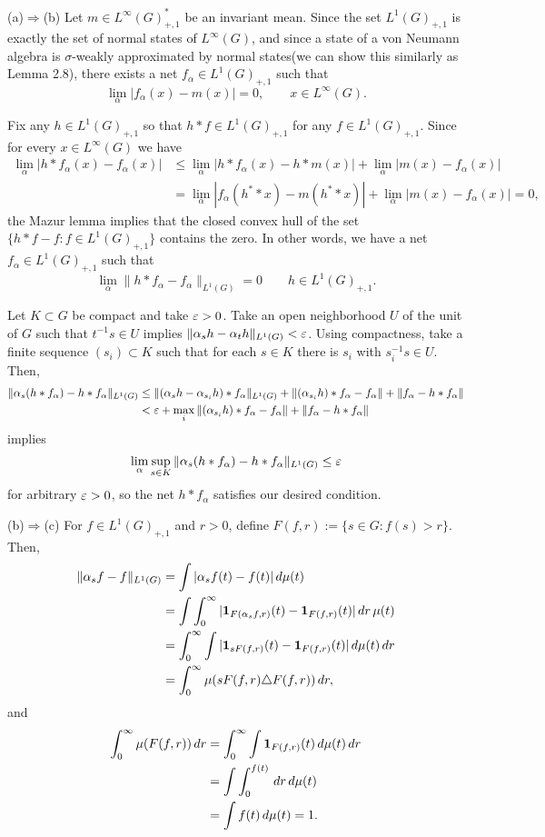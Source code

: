 \documentclass{../../../small}
\begin{document}
\begin{pf}
(a)$\Rightarrow$(b)
Let $m\in L^\infty(G)^*_{+,1}$ be an invariant mean.
Since the set $L^1(G)_{+,1}$ is exactly the set of normal states of $L^\infty(G)$, and since a state of a von Neumann algebra is $\sigma$-weakly approximated by normal states(we can show this similarly as Lemma 2.8), there exists a net $f_\alpha\in L^1(G)_{+,1}$ such that
\[\lim_\alpha|f_\alpha(x)-m(x)|=0,\qquad x\in L^\infty(G).\]

Fix any $h\in L^1(G)_{+,1}$ so that $h*f\in L^1(G)_{+,1}$ for any $f\in L^1(G)_{+,1}$.
Since for every $x\in L^\infty(G)$ we have
\begin{align*}
\lim_\alpha|h*f_\alpha(x)-f_\alpha(x)|
&\le\lim_\alpha|h*f_\alpha(x)-h*m(x)|+\lim_\alpha|m(x)-f_\alpha(x)|\\
&=\lim_\alpha|f_\alpha(h^**x)-m(h^**x)|+\lim_\alpha|m(x)-f_\alpha(x)|=0,
\end{align*}
the Mazur lemma implies that the closed convex hull of the set $\{h*f-f:f\in L^1(G)_{+,1}\}$ contains the zero.
In other words, we have a net $f_\alpha\in L^1(G)_{+,1}$ such that
\[\lim_\alpha\|h*f_\alpha-f_\alpha\|_{L^1(G)}=0\qquad h\in L^1(G)_{+,1}.\]

Let $K\subset G$ be compact and take $\varepsilon>0$.
Take an open neighborhood $U$ of the unit of $G$ such that $t^{-1}s\in U$ implies $\|\alpha_sh-\alpha_th\|_{L^1(G)}<\varepsilon$.
Using compactness, take a finite sequence $(s_i)\subset K$ such that for each $s\in K$ there is $s_i$ with $s_i^{-1}s\in U$.
Then,
\begin{align*}
\|\alpha_s(h*f_\alpha)-h*f_\alpha\|_{L^1(G)}
&\le\|(\alpha_sh-\alpha_{s_i}h)*f_\alpha\|_{L^1(G)}+\|(\alpha_{s_i}h)*f_\alpha-f_\alpha\|+\|f_\alpha-h*f_\alpha\|\\
&<\varepsilon+\max_i\|(\alpha_{s_i}h)*f_\alpha-f_\alpha\|+\|f_\alpha-h*f_\alpha\|
\end{align*}
implies
\[\lim_\alpha\sup_{s\in K}\|\alpha_s(h*f_\alpha)-h*f_\alpha\|_{L^1(G)}\le\varepsilon\]
for arbitrary $\varepsilon>0$, so the net $h*f_\alpha$ satisfies our desired condition.

(b)$\Rightarrow$(c)
For $f\in L^1(G)_{+,1}$ and $r>0$, define $F(f,r):=\{s\in G:f(s)>r\}$.
Then,
\begin{align*}
\|\alpha_sf-f\|_{L^1(G)}
&=\int|\alpha_sf(t)-f(t)|\,d\mu(t)\\
&=\int\int_0^\infty|\mathbf{1}_{F(\alpha_sf,r)}(t)-\mathbf{1}_{F(f,r)}(t)|\,dr\,\mu(t)\\
&=\int_0^\infty\int|\mathbf{1}_{sF(f,r)}(t)-\mathbf{1}_{F(f,r)}(t)|\,d\mu(t)\,dr\\
&=\int_0^\infty\mu(sF(f,r)\triangle F(f,r))\,dr,
\end{align*}
and
\begin{align*}
\int_0^\infty\mu(F(f,r))\,dr
&=\int_0^\infty\int\mathbf{1}_{F(f,r)}(t)\,d\mu(t)\,dr\\
&=\int\int_0^{f(t)}\,dr\,d\mu(t)\\
&=\int f(t)\,d\mu(t)=1.
\end{align*}


\end{pf}
\end{document}
